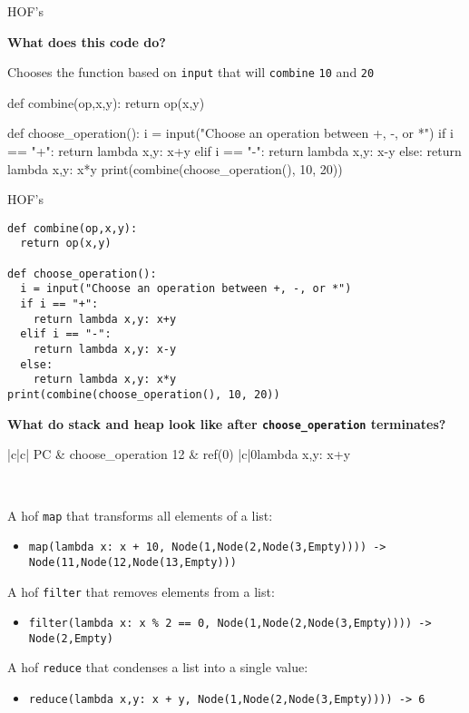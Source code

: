 \documentclass{beamer}
\begin{document}
\begin{frame}[fragile]{HOF's}
\begin{codewithblock}{\item \textbf{What does this code do?} \pause \item Chooses the function based on \texttt{input} that will \texttt{combine} \texttt{10} and \texttt{20}}
def combine(op,x,y):
  return op(x,y)

def choose_operation():
  i = input("Choose an operation between +, -, or *")
  if i == "+":
    return lambda x,y: x+y
  elif i == "-":
    return lambda x,y: x-y
  else:
    return lambda x,y: x*y
print(combine(choose_operation(), 10, 20))
\end{codewithblock}
\end{frame}

\begin{frame}[fragile]{HOF's}
\begin{lstlisting}
def combine(op,x,y):
  return op(x,y)

def choose_operation():
  i = input("Choose an operation between +, -, or *")
  if i == "+":
    return lambda x,y: x+y
  elif i == "-":
    return lambda x,y: x-y
  else:
    return lambda x,y: x*y
print(combine(choose_operation(), 10, 20))
\end{lstlisting}

\textbf{What do stack and heap look like after \texttt{choose\_operation} terminates?}

\pause

\begin{memorytable}
{|c|c|}
{PC & choose\_operation}
{12 & ref(0)}
{|c|}{0}{lambda x,y: x+y}
\end{memorytable} \ \\
\end{frame}

\begin{slide}{
\item A hof \texttt{map} that transforms all elements of a list:
\begin{itemize}
\item \texttt{map(lambda x: x + 10, Node(1,Node(2,Node(3,Empty)))) -> Node(11,Node(12,Node(13,Empty)))}
\end{itemize}
\item A hof \texttt{filter} that removes elements from a list:
\begin{itemize}
\item \texttt{filter(lambda x: x \% 2 == 0, Node(1,Node(2,Node(3,Empty)))) -> Node(2,Empty)}
\end{itemize}
\item A hof \texttt{reduce} that condenses a list into a single value:
\begin{itemize}
\item \texttt{reduce(lambda x,y: x + y, Node(1,Node(2,Node(3,Empty)))) -> 6}
\end{itemize}
}\end{slide}
\end{document}
